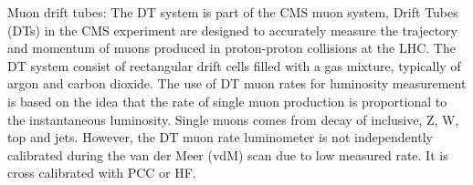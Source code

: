 \begin{itemize}
{%

\item Muon drift tubes: The DT system is part of the CMS muon system, %
  Drift Tubes (DTs) in the CMS experiment are designed to accurately measure the trajectory and momentum of muons produced in proton-proton collisions at the LHC.
  The DT system consist of rectangular drift cells filled with a gas mixture, typically of argon and carbon dioxide. The use of DT muon rates for luminosity measurement is based on the idea that the rate of single muon production is proportional to the instantaneous luminosity. Single muons comes from decay of inclusive, Z, W, top and jets.
However, the DT muon rate luminometer is not independently calibrated during the van der Meer (vdM) scan due to low measured rate. It is cross calibrated with PCC or HF.
  
}
\end{itemize}
